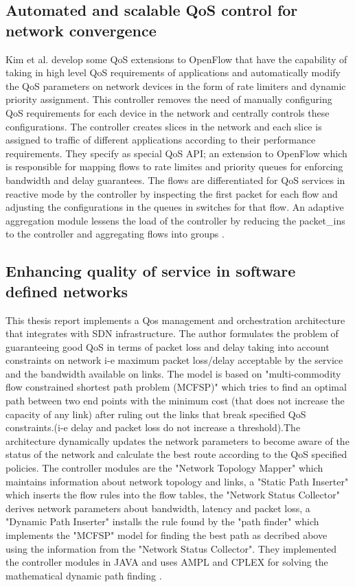 \documentclass[paper=a4, fontsize=11pt]{scrartcl}	%
\numberwithin{equation}{section}		%
\numberwithin{figure}{section}			%
\numberwithin{table}{section}				%
\begin{document}
\subsection{Automated and scalable QoS control for network convergence}
Kim et al. develop some QoS extensions to OpenFlow that have the capability of taking in high level QoS requirements of applications and automatically modify the QoS parameters on network devices in the form of rate limiters and dynamic priority assignment. This controller removes the need of manually configuring QoS requirements for each device in the network and centrally controls these configurations. The controller creates slices in the network and each slice is assigned to traffic of different applications according to their performance requirements. They specify as special QoS API; an extension to OpenFlow which is responsible for mapping flows to rate limites and priority queues for enforcing bandwidth and delay guarantees. The flows are differentiated for QoS services in reactive mode by the controller by inspecting the first packet for each flow and adjusting the configurations in the queues in switches for that flow. An adaptive aggregation module lessens the load of the controller by reducing the packet\_ins to the controller and aggregating flows into groups \cite{convergence}.
\subsection{Enhancing quality of service in software defined networks}
This thesis report implements a Qos management and orchestration architecture that integrates with SDN infrastructure. The author formulates the problem of guaranteeing good QoS in terms of packet loss and delay taking into account constraints on network i-e maximum packet loss/delay acceptable by the service and the bandwidth available on links. The model is based on "multi-commodity flow constrained shortest path problem (MCFSP)" which tries to find an optimal path
between two end points with the minimum cost (that does not increase the capacity of any link) after ruling out the links that break specified QoS constraints.(i-e delay and packet loss do not increase a threshold).The architecture dynamically updates the network parameters to become aware of the status of the network and calculate the best route according to the QoS specified policies. The controller modules are the "Network Topology Mapper" which maintains information about network topology and links, a "Static Path Inserter" which inserts the flow rules into the flow tables, the "Network Status Collector" derives network parameters about bandwidth, latency and packet loss, a "Dynamic Path Inserter" installs the rule found by the "path finder" which implements the "MCFSP" model for finding the best path as decribed above using the information from the "Network Status Collector". They implemented the controller modules in JAVA and uses AMPL and CPLEX for solving the mathematical dynamic path finding \cite{thesis}.
\end{document}
